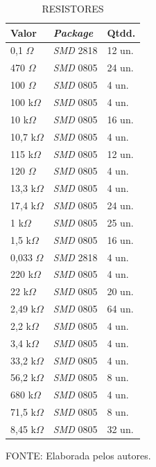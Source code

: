 \documentclass[
	12pt,				%
	openright,			%
	oneside,			%
	a4paper,			%
	english,			%
	french,				%
	spanish,			%
	brazil,				%
	oldfontcommands
	]{abntex2}
\begin{document}
	\begin{table}[th]
	\caption{RESISTORES}
	\label{Tab_Resistores}
	\centering
		\begin{tabular}{p{1.5cm}|p{2cm}|p{1.2cm}}
			\textbf{Valor} & \textbf{\textit{Package}} & \textbf{Qtdd.}\\
			\hline
			0,1 $ \Omega $ & \textit{SMD} 2818 & 12 un.\\
			470 $ \Omega $ & \textit{SMD} 0805 & 24 un.\\
			100 $ \Omega $ & \textit{SMD} 0805 & 4 un.\\
			100 k$ \Omega $ & \textit{SMD} 0805 & 4 un.\\
			10 k$ \Omega $ & \textit{SMD} 0805 & 16 un.\\
			10,7 k$ \Omega $ & \textit{SMD} 0805 & 4 un.\\
			115 k$ \Omega $ & \textit{SMD} 0805 & 12 un.\\
			120 $ \Omega $ & \textit{SMD} 0805 & 4 un.\\
			13,3 k$ \Omega $ & \textit{SMD} 0805 & 4 un.\\
			17,4 k$ \Omega $ & \textit{SMD} 0805 & 24 un.\\
			1 k$ \Omega $ & \textit{SMD} 0805 & 25 un.\\
			1,5 k$ \Omega $ & \textit{SMD} 0805 & 16 un.\\
			0,033 $ \Omega $ & \textit{SMD} 2818 & 4 un.\\
			220 k$ \Omega $ & \textit{SMD} 0805 & 4 un.\\
			22 k$ \Omega $ & \textit{SMD} 0805 & 20 un.\\
			2,49 k$ \Omega $ & \textit{SMD} 0805 & 64 un.\\
			2,2 k$ \Omega $ & \textit{SMD} 0805 & 4 un.\\
			3,4 k$ \Omega $ & \textit{SMD} 0805 & 4 un.\\
			33,2 k$ \Omega $ & \textit{SMD} 0805 & 4 un.\\
			56,2 k$ \Omega $ & \textit{SMD} 0805 & 8 un.\\
			680 k$ \Omega $ & \textit{SMD} 0805 & 4 un.\\
			71,5 k$ \Omega $ & \textit{SMD} 0805 & 8 un.\\
			8,45 k$ \Omega $ & \textit{SMD} 0805 & 32 un.\\
		\end{tabular}	
	
	\begin{small}
	\vspace{3pt}
		FONTE: Elaborada pelos autores.
	\end{small}
	\end{table}
	\pagebreak
	
\end{document}
